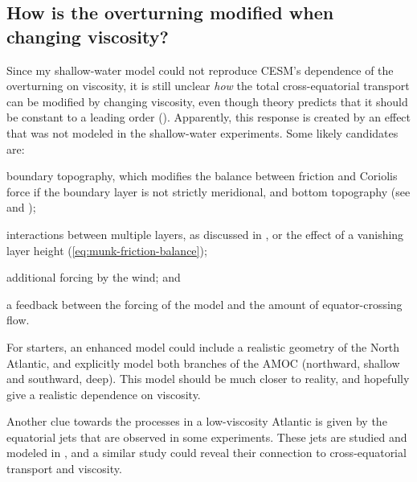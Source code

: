 \subsection{How is the overturning modified when changing viscosity?}
\label{sec:outro-moc-viscosity}
Since my shallow-water model could not reproduce \ac{CESM}'s dependence of the overturning on viscosity, it is still unclear \emph{how} the total cross-equatorial transport can be modified by changing viscosity, even though theory predicts that it should be constant to a leading order (). Apparently, this response is created by an effect that was not modeled in the shallow-water experiments. Some likely candidates are:
%
\begin{enum}
	\item boundary topography, which modifies the balance between friction and Coriolis force if the boundary layer is not strictly meridional, and bottom topography (see \eg \cite{nofbc2} and \cite{swaters});
	\item interactions between multiple layers, as discussed \eg in \cite{nofbc1}, or the effect of a vanishing layer height (\cf \eqref{eq:munk-friction-balance});
	\item additional forcing by the wind; and
	\item a feedback between the forcing of the model and the amount of equator-crossing flow.
\end{enum}
%
For starters, an enhanced model could include a realistic geometry of the North Atlantic, and explicitly model both branches of the \ac{AMOC} (northward, shallow and southward, deep). This model should be much closer to reality, and hopefully give a realistic dependence on viscosity.

Another clue towards the processes in a low-viscosity Atlantic is given by the equatorial jets that are observed in some experiments. These jets are studied and modeled in \cite{kitamura}, and a similar study could reveal their connection to cross-equatorial transport and viscosity.

